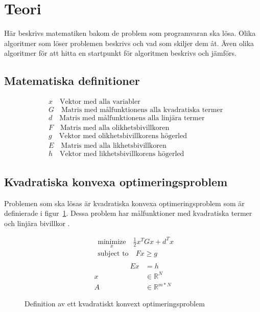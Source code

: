 \section{Teori}
Här beskrivs matematiken bakom de problem som programvaran ska lösa. Olika algoritmer som löser problemen beskrivs och vad som skiljer dem åt. Även olika algoritmer för att hitta en startpunkt för algoritmen beskrivs och jämförs.

\subsection{Matematiska definitioner}
\begin{equation*}
\begin{aligned}
&x  \quad \text{Vektor med alla variabler}\\
&G  \quad \text{Matris med målfunktionens alla kvadratiska termer}\\
&d  \quad \text{Matris med målfunktionens alla linjära termer}\\
&F  \quad \text{Matris med alla olikhetsbivillkoren}\\
&g  \quad \text{Vektor med olikhetsbivillkorens högerled}\\
&E  \quad \text{Matris med alla likhetsbivillkoren}\\
&h  \quad \text{Vektor med likhetsbivillkorens högerled}
\end{aligned}
\end{equation*}

\subsection{Kvadratiska konvexa optimeringsproblem}
Problemen som ska lösas är kvadratiska konvexa optimeringsproblem som är definierade i figur~\ref{fig:qp_def}. Dessa problem har målfunktioner med kvadratiska termer och linjära bivillkor \citep{numericaloptimization}.
\begin{figure}[H]
\begin{equation*}
\begin{aligned}
& \underset{x}{\text{minimize}} \quad \frac{1}{2} x^{T}Gx+d^{T}x \\
& \text{subject to} \quad Fx\geq g \\
\end{aligned}
\end{equation*}
\begin{equation*}
\begin{aligned}
	\quad \quad \quad \quad \quad Ex &= h \\
		x &\in \mathbb{R}^N \\
		A &\in \mathbb{R}^{m*N}
\end{aligned}
\end{equation*}
\caption{Definition av ett kvadratiskt konvext optimeringsproblem}
\label{fig:qp_def}
\end{figure}


